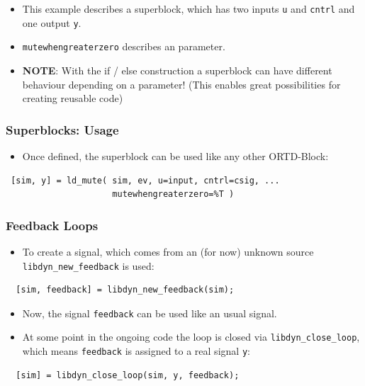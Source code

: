 \documentclass[serif,9pt,xcolor=dvipsnames]{beamer}
\begin{document}
\begin{frame}[fragile]
\begin{itemize}
 \item This example describes a superblock, which has two inputs \texttt{u} and \texttt{cntrl} and one output \texttt{y}.
\item \texttt{mutewhengreaterzero} describes an parameter.
\item \textbf{NOTE}: With the if / else construction a superblock can have different behaviour depending on a parameter! (This enables great possibilities for creating reusable code)
\end{itemize}


\end{frame}


\begin{frame}[fragile]
 \frametitle{Superblocks: Usage}
 
 \begin{itemize}
  \item Once defined, the superblock can be used like any other ORTD-Block:
 \end{itemize}

 
 {\small 
\begin{lstlisting} 
 [sim, y] = ld_mute( sim, ev, u=input, cntrl=csig, ...
                     mutewhengreaterzero=%T ) 
\end{lstlisting}}

\end{frame}




\begin{frame}[fragile]
 \frametitle{Feedback Loops}

  \begin{itemize}
   \item To create a signal, which comes from an (for now) unknown source \texttt{libdyn\_new\_feedback} is used:
  \end{itemize}


  {\small 
  \begin{lstlisting} 
  [sim, feedback] = libdyn_new_feedback(sim);
  \end{lstlisting}}

  \begin{itemize}
   \item Now, the signal \texttt{feedback} can be used like an usual signal.
   \item At some point in the ongoing code the loop is closed via \texttt{libdyn\_close\_loop}, which means \texttt{feedback} is assigned to a real signal \texttt{y}:
  \end{itemize}

  {\small 
  \begin{lstlisting} 
  [sim] = libdyn_close_loop(sim, y, feedback);
  \end{lstlisting}}
  
\end{frame}
\end{document}
